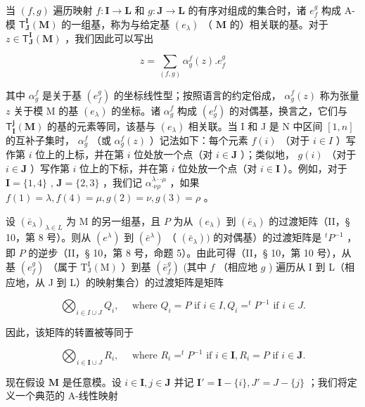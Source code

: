 当 \((f, g)\) 遍历映射 \(f: \mathbf{I} \to \mathbf{L}\) 和 \(g: \mathbf{J} \to \mathbf{L}\) 的有序对组成的集合时，诸 \(e_f^g\) 构成 A-模 \(\mathsf{T}_{\mathbf{J}}^{\mathbf{I}}(\mathbf{M})\) 的一组基，称为与给定基 \((e_{\lambda})\) （ \(\mathbf{M}\) 的）相关联的基。对于 \(z \in \mathsf{T}_{\mathbf{J}}^{\mathbf{I}}(\mathbf{M})\) ，我们因此可以写出

\[
z = \sum_ {(f, g)} \alpha_ {g} ^ {f} (z). e _ {f} ^ {g}\tag{12}
\]

其中 \(\alpha_g^f\) 是关于基 \((e_f^g)\) 的坐标线性型；按照语言的约定俗成， \(\alpha_g^f(z)\) 称为张量 \(z\) 关于模 M 的基 \((e_\lambda)\) 的坐标。诸 \(\alpha_g^f\) 构成 \((e_g^f)\) 的对偶基，换言之，它们与 \(\mathsf{T}_{\mathbf{I}}^{\mathbf{j}}(\mathbf{M})\) 的基的元素等同，该基与 \((e_\lambda)\) 相关联。当 I 和 J 是 N 中区间 \([1,n]\) 的互补子集时， \(\alpha_g^f\) （或 \(\alpha_g^f(z)\) ）记法如下：每个元素 \(f(i)\) （对于 \(i\in I\) ）写作第 \(i\) 位上的上标，并在第 \(i\) 位处放一个点（对 \(i \in \mathbf{J}\) ）；类似地， \(g(i)\) （对于 \(i \in \mathbf{J}\) ）写作第 \(i\) 位上的下标，并在第 \(i\) 位处放一个点（对 \(i \in \mathbf{I}\) ）。例如，对于 \(\mathbf{I} = \{1, 4\}\) , \(\mathbf{J} = \{2, 3\}\) ，我们记 \(\alpha_{\cdot \nu \rho}^{\lambda \cdot \cdot \mu}\) ，如果 \(f(1) = \lambda, f(4) = \mu, g(2) = \nu, g(3) = \rho\) 。

设 \((\bar{e}_{\lambda})_{\lambda \in L}\) 为 M 的另一组基，且 \(P\) 为从 \((e_{\lambda})\) 到 \((\bar{e}_{\lambda})\) 的过渡矩阵（II，§ 10，第 8 号）。则从 \((e^{\lambda})\) 到 \((\bar{e}^{\lambda})\) （ \((\bar{e}_{\lambda}))\) 的对偶基）的过渡矩阵是 \(^{t}P^{-1}\) ，即 \(P\) 的逆步（II，§ 10，第 8 号，命题 5）。由此可得（II，§ 10，第 10 号），从基 \((e_{f}^{g})\) （属于 \(\mathrm{T}_{\mathrm{J}}^{\mathrm{I}}(\mathrm{M})\) ）到基 \((\bar{e}_{f}^{g})\) (其中 \(f\) （相应地 \(g\) ) 遍历从 I 到 L（相应地，从 J 到 L）的映射集合）的过渡矩阵是矩阵

\[
\bigotimes_ {i \in I \cup J} Q _ {i}, \quad \text { where } Q _ {i} = P \text { if } i \in I, Q _ {i} = ^ {t} P ^ {- 1} \text { if } i \in J.\tag{13}
\]

因此，该矩阵的转置被等同于

\[
\bigotimes_ {i \in \mathbf {I} \cup J} R _ {i}, \quad \text { where } R _ {i} = ^ {t} P ^ {- 1} \text { if } i \in \mathbf {I}, R _ {i} = P \text { if } i \in \mathbf {J}.\tag{14}
\]

现在假设 \(\mathbf{M}\) 是任意模。设 \(i\in \mathbf{I}, j\in \mathbf{J}\) 并记 \(\mathbf{I}' = \mathbf{I} - \{i\}, J' = J - \{j\}\) ；我们将定义一个典范的 A-线性映射

